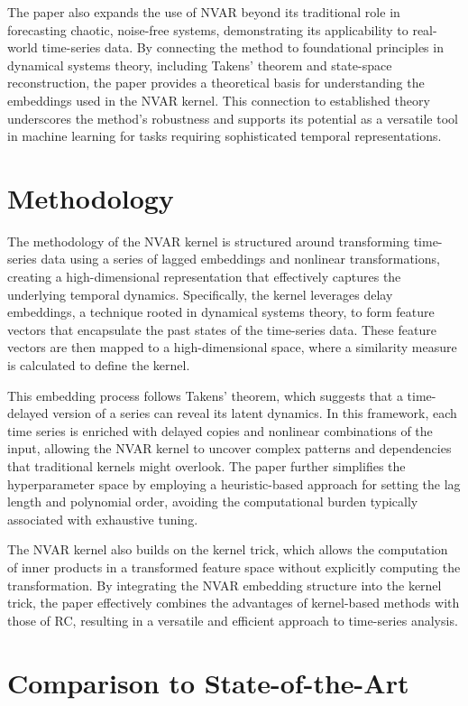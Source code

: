 The paper also expands the use of NVAR beyond its traditional role in forecasting chaotic, noise-free systems, demonstrating its applicability to real-world time-series data. By connecting the method to foundational principles in dynamical systems theory, including Takens' theorem \cite{takens1981} and state-space reconstruction, the paper provides a theoretical basis for understanding the embeddings used in the NVAR kernel. This connection to established theory underscores the method's robustness and supports its potential as a versatile tool in machine learning for tasks requiring sophisticated temporal representations.

\section{Methodology}

The methodology of the NVAR kernel is structured around transforming time-series data using a series of lagged embeddings and nonlinear transformations, creating a high-dimensional representation that effectively captures the underlying temporal dynamics. Specifically, the kernel leverages delay embeddings, a technique rooted in dynamical systems theory, to form feature vectors that encapsulate the past states of the time-series data. These feature vectors are then mapped to a high-dimensional space, where a similarity measure is calculated to define the kernel.

This embedding process follows Takens' theorem, which suggests that a time-delayed version of a series can reveal its latent dynamics. In this framework, each time series is enriched with delayed copies and nonlinear combinations of the input, allowing the NVAR kernel to uncover complex patterns and dependencies that traditional kernels might overlook. The paper further simplifies the hyperparameter space by employing a heuristic-based approach for setting the lag length and polynomial order, avoiding the computational burden typically associated with exhaustive tuning.

The NVAR kernel also builds on the kernel trick, which allows the computation of inner products in a transformed feature space without explicitly computing the transformation. By integrating the NVAR embedding structure into the kernel trick, the paper effectively combines the advantages of kernel-based methods with those of RC, resulting in a versatile and efficient approach to time-series analysis.

\section{Comparison to State-of-the-Art}

